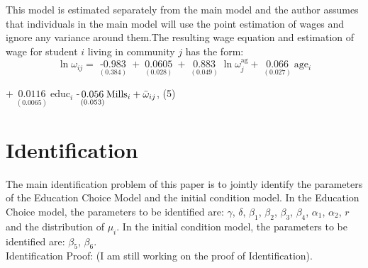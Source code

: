 \documentclass{handoutForSolutions}
\begin{document}
This model is estimated separately from the main model and the author assumes that individuals in the main model will use the point estimation of wages and ignore any variance around them.The resulting wage equation and estimation of wage for student $i$ living in community $j$ has the form:
$$
\ln\omega_{ij}=\mathop{-0.983}\limits_{(0.384)}+\mathop{0.0605P_{j}}\limits_{(0.028)}+\mathop{0.883}\limits_{(0.049)}\ln\omega^{\mathrm{a}\mathrm{g}}_j+\mathop{0.066}\limits_{(0.027)}\mathrm{a}\mathrm{g}\mathrm{e}_{i}
$$
\begin{center}
$+\mathop{0.0116}\limits_{(0.0065)}$$\mathrm{educ}_i$ -$\mathop{0.056}\limits_{(0.053)}\mathrm{M}\mathrm{i}\mathrm{l}\mathrm{l}\mathrm{s}_{i}+\Bar{\omega}_{ij}$,   (5)
\end{center}

\newpage
\section{Identification}
The main identification problem of this paper is to jointly identify the parameters of the Education Choice Model and the initial condition model. In the Education Choice model, the parameters to be identified are: $\gamma$, $\delta$, $\beta_1$, $\beta_2$, $\beta_3$, $\beta_4$, $\alpha_1$, $\alpha_2$, $r$ and the distribution of $\mu_i$. In the initial condition model, the parameters to be identified are: $\beta_5$, $\beta_6$.\\

Identification Proof: (I am still working on the proof of Identification).
\end{document}
